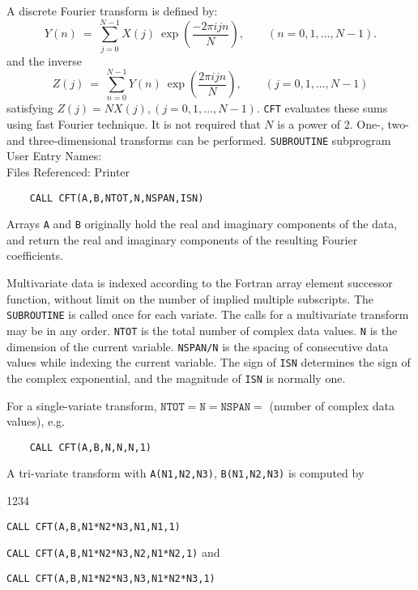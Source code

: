                          
      
                
                     
A discrete Fourier transform is defined by:
$$ Y(n) \ = \
\sum^{N-1}_{j=0}X(j) \ \exp\left(\frac{-2\pi ijn}{N}\right),
\qquad (n=0,1,\ldots,N-1). $$
and the inverse
$$ Z(j) \ = \
\sum^{N-1}_{n=0}Y(n) \ \exp\left(\frac{2\pi ijn}{N}\right),
 \qquad (j=0,1,\ldots,N-1) $$
satisfying $Z(j) = N X(j), (j = 0,1,\ldots,N-1)$.
{\tt CFT} evaluates these sums using fast Fourier technique. It
is not required that $N$ is a power of 2. One-, two- and
three-dimensional transforms can be performed.
\Structure
{\tt SUBROUTINE} subprogram  \\
User Entry Names:  \\
Files Referenced: Printer
\Usage
\begin{verbatim}
    CALL CFT(A,B,NTOT,N,NSPAN,ISN)
\end{verbatim}
Arrays {\tt A} and {\tt B} originally hold the real and imaginary
components
of the data, and return the real and imaginary components of the
resulting Fourier coefficients.
\par
Multivariate data is indexed according to the Fortran array element
successor function, without limit on the number of implied multiple
subscripts. The {\tt SUBROUTINE} is called once for each variate.
The calls for a multivariate transform may be in any order.
{\tt NTOT} is the total number of complex data values.
{\tt N} is the dimension of the current variable.
{\tt NSPAN/N} is the spacing of consecutive data values while
indexing the current variable. The sign of {\tt ISN} determines
the sign of the complex exponential, and the magnitude of {\tt ISN}
is normally one.
\par
For a single-variate transform,
$\mathtt{NTOT=N=NSPAN=}$ (number of complex data values), e.g.
\begin{verbatim}
    CALL CFT(A,B,N,N,N,1)
\end{verbatim}
A tri-variate transform with {\tt A(N1,N2,N3)}, {\tt B(N1,N2,N3)} is
computed by
\begin{DLtt}{1234}
\item[] {\tt CALL CFT(A,B,N1*N2*N3,N1,N1,1)}
\item[] {\tt CALL CFT(A,B,N1*N2*N3,N2,N1*N2,1)} \qquad and
\item[] {\tt CALL CFT(A,B,N1*N2*N3,N3,N1*N2*N3,1)}
\end{DLtt}
